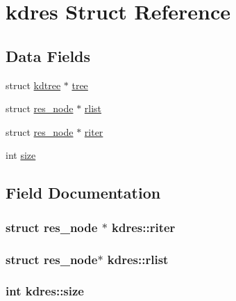 \hypertarget{structkdres}{}\section{kdres Struct Reference}
\label{structkdres}
\subsection*{Data Fields}
\begin{DoxyCompactItemize}
\item 
struct \hyperlink{structkdtree}{kdtree} $\ast$ \hyperlink{structkdres_a76eebf2c192b36e4ee8a320969f02b13}{tree}
\item 
struct \hyperlink{structres__node}{res\+\_\+node} $\ast$ \hyperlink{structkdres_a032943193c899506e0ca421fc2b0a26f}{rlist}
\item 
struct \hyperlink{structres__node}{res\+\_\+node} $\ast$ \hyperlink{structkdres_a5ea11c977a467694481b4c0fbb5befa1}{riter}
\item 
int \hyperlink{structkdres_a7ac4f6162e557c880476f7ca024ce946}{size}
\end{DoxyCompactItemize}


\subsection{Field Documentation}
\hypertarget{structkdres_a5ea11c977a467694481b4c0fbb5befa1}{}
\subsubsection[{riter}]{\setlength{\rightskip}{0pt plus 5cm}struct {\bf res\+\_\+node} $\ast$ kdres\+::riter}\label{structkdres_a5ea11c977a467694481b4c0fbb5befa1}
\hypertarget{structkdres_a032943193c899506e0ca421fc2b0a26f}{}
\subsubsection[{rlist}]{\setlength{\rightskip}{0pt plus 5cm}struct {\bf res\+\_\+node}$\ast$ kdres\+::rlist}\label{structkdres_a032943193c899506e0ca421fc2b0a26f}
\hypertarget{structkdres_a7ac4f6162e557c880476f7ca024ce946}{}
\subsubsection[{size}]{\setlength{\rightskip}{0pt plus 5cm}int kdres\+::size}\label{structkdres_a7ac4f6162e557c880476f7ca024ce946}
\hypertarget{structkdres_a76eebf2c192b36e4ee8a320969f02b13}{}
